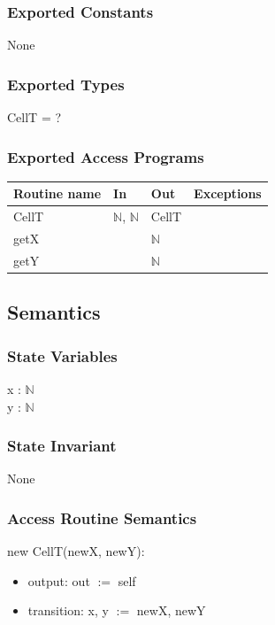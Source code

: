 \documentclass[12pt]{article}
\begin{document}
\subsubsection* {Exported Constants}

None

\subsubsection* {Exported Types}

CellT = ?

\medskip

\subsubsection* {Exported Access Programs}

\begin{tabular}{| l | l | l | p{6cm} |}
\hline
\textbf{Routine name} & \textbf{In} & \textbf{Out} & \textbf{Exceptions}\\
\hline
CellT & $\mathbb{N}$, $\mathbb{N}$ & CellT & \\
\hline
getX & ~ & $\mathbb{N}$ & \\
\hline
getY & ~ & $\mathbb{N}$ & \\
\hline
\end{tabular}

\subsection* {Semantics}

\subsubsection* {State Variables}

x : $\mathbb{N}$\\
y : $\mathbb{N}$

\subsubsection* {State Invariant}

None

\subsubsection* {Access Routine Semantics}

new CellT(newX, newY):

\begin{itemize}
  \item output: out $:=$ self
  \item transition: x, y $:=$ newX, newY
\end{itemize}
\end{document}
